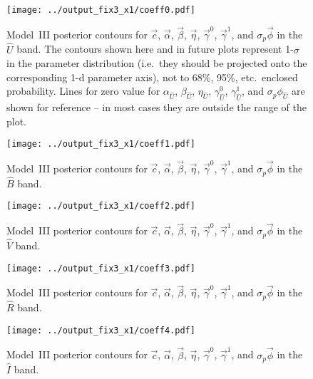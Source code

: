 \documentclass[trackchanges]{aastex61}   	%
\begin{document}
{\begin{figure}[htbp] %
   \centering
   \texttt{[image: ../output\_fix3\_x1/coeff0.pdf]} 
            \caption{Model~III posterior contours for $\vec{c}$, $\vec{\alpha}$, $\vec{\beta}$, $\vec{\eta}$, $\vec{\gamma}^0$, $\vec{\gamma}^1$, and $\sigma_p \vec{\phi}$ in the ${\hat{U}}$ band.
            The contours shown here and in future plots represent 1-$\sigma$ in the parameter distribution (i.e.\ they should be
            projected onto the corresponding 1-d parameter axis), not to 68\%, 95\%, etc.\
            enclosed probability.  Lines for zero value for $\alpha_{\hat{U}}$, $\beta_{\hat{U}}$, $\eta_{\hat{U}}$, $\gamma_{\hat{U}}^0$, $\gamma_{\hat{U}}^1$, and $\sigma_p \phi_{\hat{U}}$ are shown for reference --
            in most cases they are outside the range of the plot.
            \label{global1:fig}}
\end{figure}

\begin{figure}[htbp] %
   \centering
   \texttt{[image: ../output\_fix3\_x1/coeff1.pdf]} 
            \caption{Model~III posterior contours for $\vec{c}$, $\vec{\alpha}$, $\vec{\beta}$, $\vec{\eta}$,  $\vec{\gamma}^0$, $\vec{\gamma}^1$, and $\sigma_p \vec{\phi}$ in the ${\hat{B}}$ band.
 \label{global2:fig}}
\end{figure}

\begin{figure}[htbp] %
   \centering
   \texttt{[image: ../output\_fix3\_x1/coeff2.pdf]} 
            \caption{Model~III posterior contours for $\vec{c}$, $\vec{\alpha}$, $\vec{\beta}$, $\vec{\eta}$, $\vec{\gamma}^0$, $\vec{\gamma}^1$, and $\sigma_p \vec{\phi}$ in the ${\hat{V}}$ band.
 \label{global3:fig}}
\end{figure}

\begin{figure}[htbp] %
   \centering
      \texttt{[image: ../output\_fix3\_x1/coeff3.pdf]} 
            \caption{Model~III posterior contours for  $\vec{c}$, $\vec{\alpha}$, $\vec{\beta}$, $\vec{\eta}$,  $\vec{\gamma}^0$, $\vec{\gamma}^1$, and $\sigma_p \vec{\phi}$ in the ${\hat{R}}$ band.
 \label{global4:fig}}
\end{figure}

\begin{figure}[htbp] %
   \centering
         \texttt{[image: ../output\_fix3\_x1/coeff4.pdf]} 
            \caption{Model~III posterior contours for  $\vec{c}$, $\vec{\alpha}$, $\vec{\beta}$, $\vec{\eta}$, $\vec{\gamma}^0$, $\vec{\gamma}^1$, and $\sigma_p \vec{\phi}$ in the ${\hat{I}}$ band.
 \label{global5:fig}}
\end{figure}




}
\end{document}
